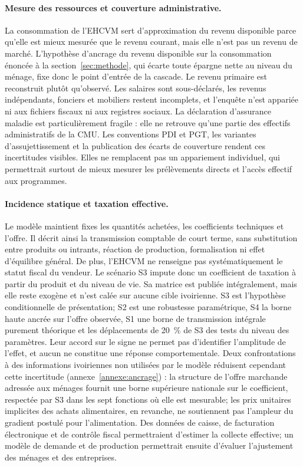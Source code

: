 \documentclass[11pt,a4paper]{article}
\begin{document}
\paragraph{Mesure des ressources et couverture administrative.}
La consommation de l'EHCVM sert d'approximation du revenu disponible parce
qu'elle est mieux mesurée que le revenu courant, mais elle n'est pas un revenu
de marché. L'hypothèse d'ancrage du revenu disponible sur la consommation
énoncée à la section~\ref{sec:methode}, qui écarte toute épargne nette au niveau
du ménage, fixe donc le point d'entrée de la cascade. Le revenu primaire est
reconstruit plutôt qu'observé. Les
salaires sont sous-déclarés, les revenus indépendants, fonciers et mobiliers
restent incomplets, et l'enquête n'est appariée ni aux fichiers fiscaux ni aux
registres sociaux. La déclaration d'assurance maladie est particulièrement
fragile : elle ne retrouve qu'une partie des effectifs administratifs de la
CMU. Les conventions PDI et PGT, les variantes d'assujettissement et la
publication des écarts de couverture rendent ces incertitudes visibles. Elles
ne remplacent pas un appariement individuel, qui permettrait surtout de mieux
mesurer les prélèvements directs et l'accès effectif aux programmes.

\paragraph{Incidence statique et taxation effective.}
Le modèle maintient fixes les quantités achetées, les coefficients techniques
et l'offre. Il décrit ainsi la transmission comptable de court terme, sans
substitution entre produits ou intrants, réaction de production, formalisation
ni effet d'équilibre général. De plus, l'EHCVM ne renseigne pas
systématiquement le statut fiscal du vendeur. Le scénario S3 impute donc un
coefficient de taxation à partir du produit et du niveau de vie. Sa matrice est
publiée intégralement, mais elle reste exogène et n'est calée sur aucune cible
ivoirienne. S3 est l'hypothèse conditionnelle de présentation; S2 est une
robustesse paramétrique, S4 la borne haute ancrée sur l'offre observée, S1 une
borne de transmission intégrale purement théorique et les déplacements de
20~\% de S3 des tests du niveau des paramètres. Leur accord sur
le signe ne permet pas d'identifier l'amplitude de l'effet, et aucun ne constitue
une réponse comportementale. Deux confrontations à des informations ivoiriennes
non utilisées par le modèle réduisent cependant cette incertitude
(annexe~\ref{annexe:ancrage}) : la structure de l'offre marchande adressée aux
ménages fournit une borne supérieure nationale sur le coefficient, respectée par
S3 dans les sept fonctions où elle est mesurable; les prix unitaires implicites
des achats alimentaires, en revanche, ne soutiennent pas l'ampleur du gradient
postulé pour l'alimentation.
Des données de caisse, de facturation électronique et de contrôle fiscal permettraient d'estimer la
collecte effective; un modèle de demande et de production permettrait ensuite
d'évaluer l'ajustement des ménages et des entreprises.
\end{document}
